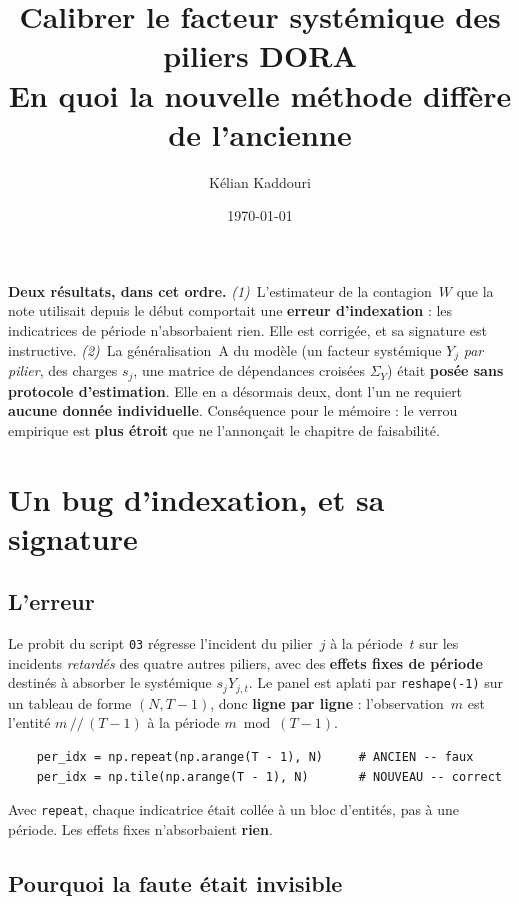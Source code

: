 \documentclass[11pt,a4paper]{article}
\title{\vspace{-1.2cm}\color{navy}\bfseries Calibrer le facteur systémique des piliers DORA\\[2pt]
  \large En quoi la nouvelle méthode diffère de l'ancienne}
\author{Kélian Kaddouri}
\date{\today}
\newcommand{\Y}{Y}
\begin{document}
\maketitle
\vspace{-0.6cm}

\begin{cle}
\textbf{Deux résultats, dans cet ordre.} \emph{(1)}~L'estimateur de la contagion~$W$ que la
note utilisait depuis le début comportait une \textbf{erreur d'indexation} : les indicatrices
de période n'absorbaient rien. Elle est corrigée, et sa signature est instructive. \emph{(2)}~La
généralisation~A du modèle (un facteur systémique $\Y_j$ \emph{par pilier}, des charges $s_j$,
une matrice de dépendances croisées $\Sigma_Y$) était \textbf{posée sans protocole
d'estimation}. Elle en a désormais deux, dont l'un ne requiert
\textbf{aucune donnée individuelle}. Conséquence pour le mémoire : le verrou empirique est
\textbf{plus étroit} que ne l'annonçait le chapitre de faisabilité.
\end{cle}

\section{Un bug d'indexation, et sa signature}

\subsection{L'erreur}

Le probit du script \texttt{03} régresse l'incident du pilier~$j$ à la période~$t$ sur les
incidents \emph{retardés} des quatre autres piliers, avec des \textbf{effets fixes de
période} destinés à absorber le systémique $s_j \Y_{j,t}$. Le panel est aplati par
\texttt{reshape(-1)} sur un tableau de forme $(N, T-1)$, donc \textbf{ligne par ligne} :
l'observation~$m$ est l'entité $m \,//\, (T-1)$ à la période $m \bmod (T-1)$.

\begin{verbatim}
    per_idx = np.repeat(np.arange(T - 1), N)     # ANCIEN -- faux
    per_idx = np.tile(np.arange(T - 1), N)       # NOUVEAU -- correct
\end{verbatim}

\noindent
Avec \texttt{repeat}, chaque indicatrice était collée à un bloc d'entités, pas à une période.
Les effets fixes n'absorbaient \textbf{rien}.

\subsection{Pourquoi la faute était invisible}
\end{document}
